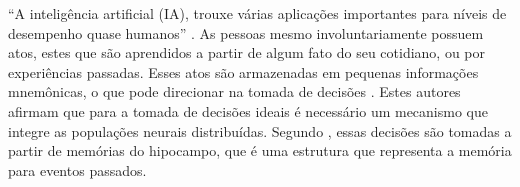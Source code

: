 “A inteligência artificial (IA), trouxe várias aplicações importantes para níveis de desempenho quase humanos” \cite{anthes}.
As pessoas mesmo involuntariamente possuem atos, estes que são aprendidos a partir de algum fato do seu cotidiano, ou por experiências passadas. Esses atos são armazenadas em pequenas informações mnemônicas, o que pode direcionar na tomada de decisões \cite{buzsaki}. Estes autores afirmam que  para a tomada de decisões ideais é necessário um mecanismo que integre  as populações neurais distribuídas. Segundo \cite{eichenbaum}, essas decisões são tomadas a partir de memórias do hipocampo, que é uma estrutura que representa a memória para eventos passados.

